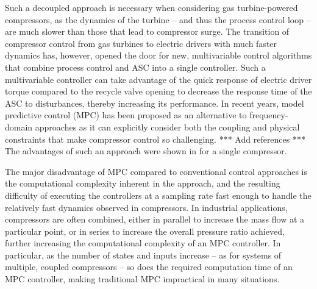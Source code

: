 Such a decoupled approach is necessary when considering gas turbine-powered compressors, as the dynamics of the turbine -- and thus the process control loop -- are much slower than those that lead to compressor surge. 
The transition of compressor control from gas turbines to electric drivers with much faster dynamics has, however, opened the door for new, multivariable control algorithms that combine process control and ASC into a single controller.
Such a multivariable controller can take advantage of the quick response of electric driver torque compared to the recycle valve opening to decrease the response time of the ASC to disturbances, thereby increasing its performance.
In recent years, model predictive control (MPC) has been proposed as an alternative to frequency-domain approaches as it can explicitly consider both the coupling and physical constraints that make compressor control so challenging.
*** Add references ***
The advantages of such an approach were shown in \cite{Cortinovis2015} for a single compressor.

The major disadvantage of MPC compared to conventional control approaches is the computational complexity inherent in the approach, and the resulting difficulty of executing the controllers at a sampling rate fast enough to handle the relatively fast dynamics observed in compressors. 
In industrial applications, compressors are often combined, either in parallel to increase the mass flow at a particular point, or in series to increase the overall pressure ratio achieved, further increasing the computational complexity of an MPC controller.
In particular, as the number of states and inputs increase -- as for systems of multiple, coupled compressors -- so does the required computation time of an MPC controller, making traditional MPC impractical in many situations. 

